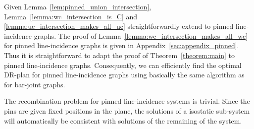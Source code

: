 Given Lemma~\ref{lem:pinned_union_intersection}, %
Lemma~\ref{lemma:wc_intersection_is_C} and \ref{lemma:uc_intersection_makes_all_uc} straightforwardly extend to  pinned line-incidence graphs. The proof of Lemma~\ref{lemma:wc_intersection_makes_all_wc} for pinned
line-incidence graphs is given in Appendix~\ref{sec:appendix_pinned}.
Thus it is straightforward to adapt the proof of Theorem~\ref{theorem:main}
to  pinned line-incidence graphs.
%
Consequently, we can efficiently find the optimal DR-plan for  pinned line-incidence graphs using basically the same algorithm as for  bar-joint graphs.

\noindent
\note The recombination problem for  pinned line-incidence systems is trivial.
Since the pins are given fixed positions in the plane,
the solutions of a isostatic sub-system will automatically be consistent with solutions of the remaining of the system.



